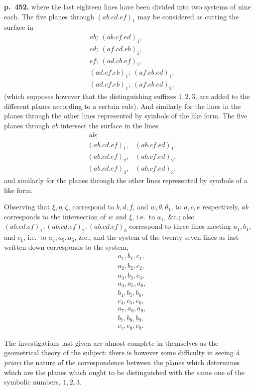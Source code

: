 \documentclass[11pt]{article}
\begin{document}
\bigskip
\noindent\textbf{p.~452.} where the last eighteen lines have been divided into two systems of nine each. The five planes through $(ab.cd.ef)_1$ may be considered as cutting the surface in
\[
\begin{aligned}
& ab;\ (ab.cf.ed)_1,\\
& cd;\ (af.cd.eb)_1,\\
& ef;\ (ad.cb.ef)_1,\\
& (ad.cf.eb)_1;\ (af.cb.ed)_1,\\
& (ad.cf.eb)_1;\ (af.cb.ed)_2,
\end{aligned}
\]
(which supposes however that the distinguishing suffixes $1, 2, 3$, are added to the different planes according to a certain rule). And similarly for the lines in the planes through the other lines represented by symbols of the like form. The five planes through $ab$ intersect the surface in the lines
\[
\begin{aligned}
&\ ab; \\
&(ab.cd.ef)_1, &(ab.cf.ed)_1,\\
&(ab.cd.ef)_2, &(ab.cf.ed)_2,\\
&(ab.cd.ef)_3, &(ab.cf.ed)_3,
\end{aligned}
\]
and similarly for the planes through the other lines represented by symbols of a like form.

Observing that $\xi, \eta, \zeta$, correspond to $b, d, f$, and $w, \theta, \theta_1$, to $a, c, e$ respectively, $ab$ corresponds to the intersection of $w$ and $\xi$, i.e.\ to $a_1$, \&c.; also $(ab.cd.ef)_1, (ab.cd.ef)_2, (ab.cd.ef)_3$ correspond to three lines meeting $a_1, b_1$, and $c_1$, i.e.\ to $a_4, a_5, a_6$, \&c.; and the system of the twenty-seven lines as last written down corresponds to the system,
\[
\begin{aligned}
& a_1, b_1, c_1,\\
& a_2, b_2, c_2,\\
& a_3, b_3, c_3,\\
& a_4, a_5, a_6,\\
& b_4, b_5, b_6,\\
& c_4, c_5, c_6,\\
& a_7, a_8, a_9,\\
& b_7, b_8, b_9,\\
& c_7, c_8, c_9.
\end{aligned}
\]

The investigations last given are almost complete in themselves as the geometrical theory of the subject: there is however some difficulty in seeing \textit{\`a priori} the nature of the correspondence between the planes which determines which are the planes which ought to be distinguished with the same one of the symbolic numbers, $1, 2, 3$.
\end{document}
